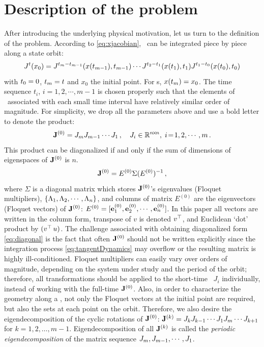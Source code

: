 \documentclass[final,leqno,onefignum,onetabnum]{siamltexmm}
\begin{document}
\section{Description of the problem}
\label{sect:problem}

After introducing the underlying physical motivation, let us turn
to the definition of the problem. According to
\eqref{eq:xjacobian}, \JacobianM\ can be integrated piece by
piece along a state orbit:
\[
J^{t}(x_0) =
J^{t_{m}-t_{m-1}}(x(t_{m-1}) ,t_{m-1})
\cdots
J^{t_{2}-t_{1}}(x(t_{1}) ,t_{1})
J^{t_{1}-t_{0}}(x(t_{0}) ,t_{0})
\]
with $t_{0}=0$, $t_{m}=t$ and $x_0$ the initial point. For \po s,
$x(t_{m}) = x_0$.
The time sequence $t_i$, $i=1,2,\cdots, m-1$ is
chosen properly such that the elements of
\JacobianM\ associated with each small time interval have relatively
similar order of magnitude.
For simplicity, we drop all the parameters above and use a bold
letter to denote the product:
\begin{equation}
\ps{\jMps}{0}=\jMps_{m}\jMps_{m-1}\cdots \jMps_{1}\,,\quad
\jMps_{i}\in \mathbb{R}^{n\!\times\! n},\; i\!=\!1,2,\cdots,m
\,.
\label{eq:problem}
\end{equation}
This product can be diagonalized if and only if the sum of
dimensions of eigenspaces of $\mathbf{J}^{(0)}$ is $n$.
\begin{equation}
  \label{eq:diagonal}
  \ps{\jMps}{0}=E^{(0)}\Sigma(E^{(0)})^{-1}
  \,,
\end{equation}
where $\Sigma$ is a diagonal matrix which stores $\mathbf{J}^{(0)}$'s
eigenvalues (Floquet multipliers),
$\{ \Lambda_{1}, \Lambda_{2}, \cdots, \Lambda_{n}\}$, and
columns of matrix $E^{(0)}$ are the eigenvectors (Floquet vectors)
of $\mathbf{J}^{(0)}$:
$E^{(0)}=[{\bf e}_{1}^{(0)}, {\bf e}_{2}^{(0)}, \cdots, {\bf e}_{n}^{(0)}]$. In this paper all
vectors are written in the column form, transpose of $v$ is denoted
${v}{}^\top$, and Euclidean `dot' product by $({v}{}^\top\,u)$. The
challenge associated with obtaining diagonalized form \eqref{eq:diagonal}
is the fact that often $\mathbf{J}^{(0)}$ should not be written
explicitly since the integration process \eqref{eq:tangentDynamics} may overflow
or the resulting matrix is highly ill-conditioned.
Floquet multipliers can easily vary over 
orders of magnitude,
depending on the system under study and the period of the orbit;
therefore, all transformations should be applied to the short-time
\JacobianMs\ $J_i$ individually, instead of working with the full-time
$\mathbf{J}^{(0)}$.
Also, in order to characterize
the geometry along a \po, not only the Floquet
vectors at the initial point are required, but also the
sets at each point on the orbit. Therefore, we also desire
the eigendecomposition of the cyclic rotations of $\mathbf{J}^{(0)}$:
$\mathbf{J}^{(k)}=J_{k}J_{k-1}\cdots J_{1}J_{m}\cdots
J_{k+1}$ for $k=1,2,\dots,m\!-\!1$. Eigendecomposition of all
$\mathbf{J}^{(k)}$ is called the \emph{periodic eigendecomposition} of the
matrix sequence $J_{m}, J_{m-1}, \cdots ,J_{1}$.
\end{document}
